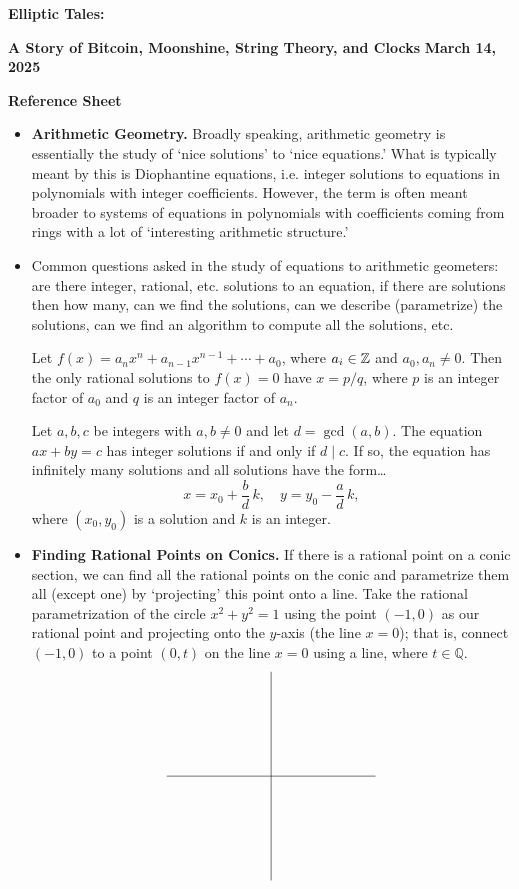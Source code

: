 \documentclass[11pt,letterpaper]{article}
\begin{document}
\begin{center}
{\bfseries\Large Elliptic Tales:} \par 
{\bfseries\large A Story of Bitcoin, Moonshine, String Theory, and Clocks} \pspace
{\bfseries\large March 14, 2025} \par\vspace{1cm}
{\large \bfseries Reference Sheet}
\end{center}

\begin{itemize}
\item {\bfseries Arithmetic Geometry.} Broadly speaking, arithmetic geometry is essentially the study of `nice solutions' to `nice equations.' What is typically meant by this is Diophantine equations, i.e. integer solutions to equations in polynomials with integer coefficients. However, the term is often meant broader to systems of equations in polynomials with coefficients coming from rings with a lot of `interesting arithmetic structure.'

\item Common questions asked in the study of equations to arithmetic geometers: are there integer, rational, etc. solutions to an equation, if there are solutions then how many, can we find the solutions, can we describe (parametrize) the solutions, can we find an algorithm to compute all the solutions, etc. 

 \begin{thm*}
Let $f(x)= a_n x^n + a_{n-1} x^{n-1} + \cdots + a_0$, where $a_i \in \mathbb{Z}$ and $a_0,a_n \neq 0$. Then the only rational solutions to $f(x)=0$ have $x= p/q$, where $p$ is an integer factor of $a_0$ and $q$ is an integer factor of $a_n$. 
\end{thm*}

\begin{thm*}
Let $a, b, c$ be integers with $a, b \neq 0$ and let $d= \gcd(a, b)$. The equation $ax + by= c$ has integer solutions if and only if $d \mid c$. If so, the equation has infinitely many solutions and all solutions have the form\dots
	\[
	x= x_0 + \frac{b}{d} \, k, \quad y= y_0 - \frac{a}{d} \, k,
	\]
where $(x_0, y_0)$ is a solution and $k$ is an integer. 
\end{thm*}

\item {\bfseries Finding Rational Points on Conics.} If there is a rational point on a conic section, we can find all the rational points on the conic and parametrize them all (except one) by `projecting' this point onto a line. Take the rational parametrization of the circle $x^2 + y^2= 1$ using the point $(-1, 0)$ as our rational point and projecting onto the $y$-axis (the line $x= 0$); that is, connect $(-1, 0)$ to a point $(0, t)$ on the line $x= 0$ using a line, where $t \in \mathbb{Q}$.
	\[
	\begin{tikzpicture}[scale=1.75]
	\draw (-1.5,0) -- (1.5,0);
	\draw (0,-1.5) -- (0,1.5);


\end{tikzpicture}\]
\end{itemize}
\end{document}
